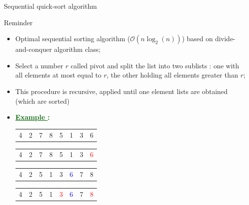 \documentclass[compress,10pt,aspectratio=169]{beamer}
\begin{document}
\begin{frame}[fragile]{Sequential quick-sort algorithm}
    \scriptsize
    \begin{block}{\small Reminder}
        \begin{itemize}
            \item Optimal sequential sorting algorithm ($\mathcal{O}(n\log_{2}(n))$) based on divide-and-conquer algorithm class;
            \item Select a number $r$ called \alert{pivot} and split the list into two sublists : one with all elements at most equal
                  to $r$, the other holding all elements greater than $r$;
            \item This procedure is recursive, applied until one element lists are obtained (which are sorted)
            \item \textcolor{DarkGreen}{\bf \underline{Example }: }
             {
            \begin{center}
                \begin{tabular}{cccccccc}
                    4 & 2 & 7 & 8 & 5 & 1 & 3 & 6 \\
                \end{tabular}
            \end{center}
            }
             { 
            \begin{center}
                \begin{tabular}{cccccccc}
                    4 & 2 & 7 & 8 & 5 & 1 & 3 & \textcolor{red}{6} \\
                \end{tabular}
            \end{center}
            }
             { 
            \begin{center}
                \begin{tabular}{cccccccc}
                    4 & 2 & 5 & 1 & 3 & \textcolor{blue}{6} & 7 & 8 \\
                \end{tabular}
            \end{center}
            }
             { 
            \begin{center}
                \begin{tabular}{cccccccc}
                    4 & 2 & 5 & 1 & \textcolor{red}{3} & \textcolor{blue}{6} & 7 & \textcolor{red}{8} \\
                \end{tabular}
            \end{center}
}
\end{itemize}
\end{block}
\end{frame}
\end{document}
